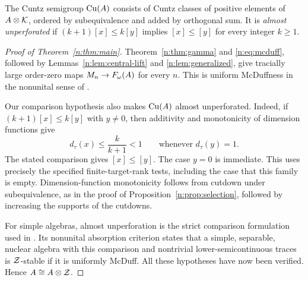 The Cuntz semigroup $\operatorname{Cu}(A)$ consists of Cuntz classes of positive elements
of $A\otimes\mathcal K$, ordered by subequivalence and added by orthogonal sum.
It is \emph{almost unperforated} if $(k+1)[x]\le k[y]$ implies $[x]\le[y]$
for every integer $k\ge1$.

\begin{proof}[Proof of Theorem~\ref{n:thm:main}]
Theorem~\ref{n:thm:gamma} and \eqref{n:eq:mcduff}, followed by
Lemmas~\ref{n:lem:central-lift} and \ref{n:lem:generalized}, give tracially
large order-zero maps $M_n\to F_\omega(A)$ for every $n$. This is uniform
McDuffness in the nonunital sense of \cite[Definition 2.4]{CLS}.

Our comparison hypothesis also makes $\operatorname{Cu}(A)$ almost unperforated.
Indeed, if $(k+1)[x]\le k[y]$ with $y\ne0$, then additivity and
monotonicity of dimension functions give
\[
 d_\tau(x)\le\frac{k}{k+1}<1
 \qquad\text{whenever }d_\tau(y)=1.
\]
The stated comparison gives $[x]\le[y]$. The case $y=0$ is immediate.
This uses precisely the specified finite-target-rank tests, including
the case that this family is empty. Dimension-function monotonicity
follows from cutdown under subequivalence, as in the proof of
Proposition~\ref{n:prop:selection}, followed by increasing the supports
of the cutdowns.

For simple algebras, almost unperforation is the strict comparison
formulation used in \cite[Section 2.3]{CLS}. Its nonunital absorption
criterion \cite[Proposition 5.4]{CLS} states that a simple, separable,
nuclear algebra with this comparison and nontrivial
lower-semicontinuous traces is $\mathcal Z$-stable if it is uniformly McDuff.
All these hypotheses have now been verified. Hence $A\cong A\otimes\mathcal Z$.
\end{proof}
